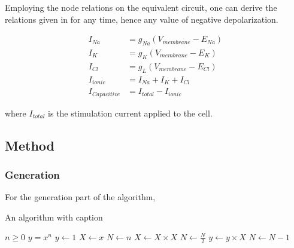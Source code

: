 \documentclass{IEEEtran}
\begin{document}
Employing the node relations on the equivalent circuit, one can derive the relations given in  for any time, hence any value of negative depolarization.

\begin{align}
    I_{Na} &= g_{Na}(V_{membrane} - E_{Na}) \label{eqn:node1}\\
    I_{K} &= g_{K}(V_{membrane} - E_{K}) \label{eqn:node2}\\
    I_{Cl} &= g_{L}(V_{membrane} - E_{Cl}) \label{eqn:node3}\\
    I_{ionic} &= I_{Na} + I_{K} + I_{Cl} \label{eqn:kirch1}\\
    I_{Capacitive} &= I_{total} - I_{ionic} \label{eqn:kirch2}
\end{align}

where $I_{total}$ is the stimulation current applied to the cell. 

\subsection{Method}
\subsubsection{Generation}

For the generation part of the algorithm, 

\begin{algorithm}
    \caption{An algorithm with caption}\label{alg:cap}
    \begin{algorithmic}
    \Require $n \geq 0$
    \Ensure $y = x^n$
    \State $y \gets 1$
    \State $X \gets x$
    \State $N \gets n$
        \State $X \gets X \times X$
        \State $N \gets \frac{N}{2}$  
        \State $y \gets y \times X$
        \State $N \gets N - 1$
    \EndIf
    \EndWhile
    \end{algorithmic}
\end{algorithm}


\clearpage
\printbibliography{}
\end{document}
